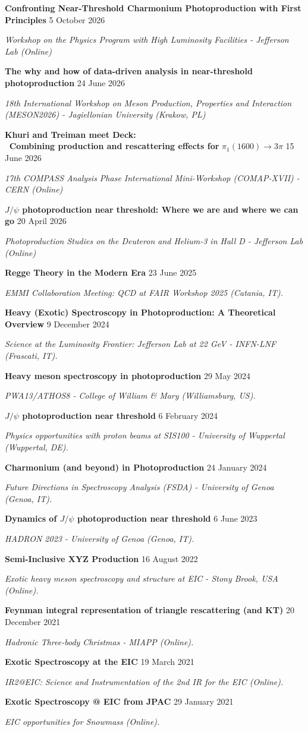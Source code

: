 \documentclass[letterpaper,11pt]{article}
\newcommand{\entrymid}[4][]{
    \item[#1] \small{#2} \hfill \small{#3}
    \vspace{-\smallskipamount} \item[]\small{\textit{#4}}}
\begin{document}
{
    \entrymid[\textbullet]
    {\textbf{Confronting Near-Threshold Charmonium Photoproduction with First Principles}}{5 October 2026}{Workshop on the Physics Program with High Luminosity Facilities - Jefferson Lab (Online)
    }
    \entrymid[\textbullet]
    {\textbf{The why and how of data-driven analysis in near-threshold photoproduction }}{24 June 2026}{18th International Workshop on Meson Production, Properties and Interaction (MESON2026) - Jagiellonian University (Krakow, PL)   
    }

    \entrymid[\textbullet]
    {\textbf{ Khuri and Treiman meet Deck: \\
    \, Combining production and rescattering effects for} $\pi_1(1600) \to 3\pi$}{15 June 2026}{17th COMPASS Analysis Phase International Mini-Workshop (COMAP-XVII) - CERN (Online)   
    }

    \entrymid[\textbullet]
    {\textbf{$J/\psi$ photoproduction near threshold: Where we are and where we can go}}{20 April 2026}{Photoproduction Studies on the Deuteron and Helium-3 in Hall D - Jefferson Lab (Online)   
    }

    \entrymid[\textbullet]
    {\textbf{Regge Theory in the Modern Era
    }}{23 June 2025}{EMMI Collaboration Meeting: QCD at FAIR Workshop 2025 (Catania, IT). 
    }

    \entrymid[\textbullet]
    {\textbf{Heavy (Exotic) Spectroscopy in Photoproduction: A Theoretical Overview
    }}{9 December 2024}{Science at the Luminosity Frontier: Jefferson Lab at 22 GeV - INFN-LNF (Frascati, IT). 
    }

    \entrymid[\textbullet]
    {\textbf{Heavy meson spectroscopy in photoproduction}}{29 May 2024}{PWA13/ATHOS8 - College of William \& Mary (Williamsburg, US). 
    }

    \entrymid[\textbullet]
    {\textbf{$J/\psi$ photoproduction near threshold}}{6 February 2024}{Physics opportunities with proton beams at SIS100 - University of Wuppertal (Wuppertal, DE). 
    }

    \entrymid[\textbullet]
    {\textbf{Charmonium (and beyond) in Photoproduction}}{24 January 2024}{Future Directions in Spectroscopy Analysis (FSDA) - University of Genoa (Genoa, IT). 
    }

    \entrymid[\textbullet]
    {\textbf{Dynamics of $J/\psi$ photoproduction near threshold}}{6 June 2023}{HADRON 2023 - University of Genoa (Genoa, IT). 
    }

    \entrymid[\textbullet]
    {\textbf{Semi-Inclusive XYZ Production}}{16 August 2022}{Exotic heavy meson spectroscopy and structure at EIC - Stony Brook, USA (Online). 
    }

    \entrymid[\textbullet]
    {\textbf{Feynman integral representation of triangle rescattering (and KT)
    }}{20 December 2021}{Hadronic Three-body Christmas
    - MIAPP (Online).
    }

    \entrymid[\textbullet]
    {\textbf{Exotic Spectroscopy at the EIC}}{19 March 2021}{IR2@EIC: Science and Instrumentation of the 2nd IR for the EIC (Online).
    }

    \entrymid[\textbullet]
    {\textbf{Exotic Spectroscopy @ EIC from JPAC}}{29 January 2021}{EIC opportunities for Snowmass (Online).
    }
}
\end{document}
